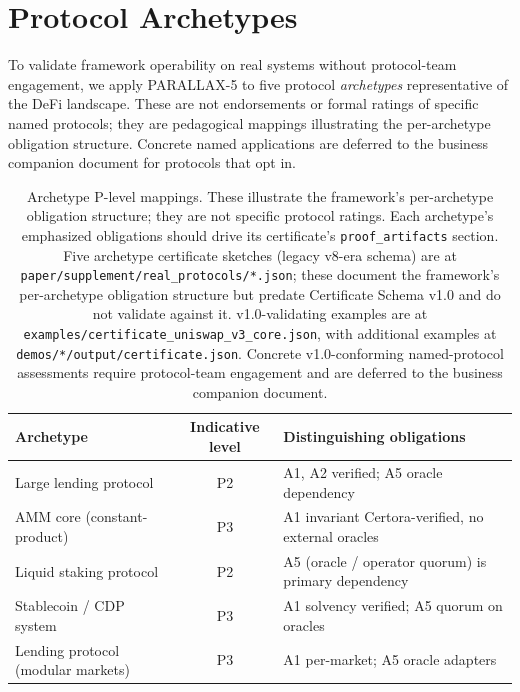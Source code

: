\documentclass[11pt,a4paper]{article}
\begin{document}
\clearpage

\section{Protocol Archetypes}\label{app:archetypes}

To validate framework operability on real systems without protocol-team engagement, we apply PARALLAX-5 to five protocol \emph{archetypes} representative of the DeFi landscape. These are not endorsements or formal ratings of specific named protocols; they are pedagogical mappings illustrating the per-archetype obligation structure. Concrete named applications are deferred to the business companion document for protocols that opt in.

\begin{table}[h]
\centering
\small
\begin{tabular}{p{4.5cm}cp{6.5cm}}
\toprule
Archetype & Indicative level & Distinguishing obligations \\
\midrule
Large lending protocol & P2 & A1, A2 verified; A5 oracle dependency \\
AMM core (constant-product) & P3 & A1 invariant Certora-verified, no external oracles \\
Liquid staking protocol & P2 & A5 (oracle / operator quorum) is primary dependency \\
Stablecoin / CDP system & P3 & A1 solvency verified; A5 quorum on oracles \\
Lending protocol (modular markets) & P3 & A1 per-market; A5 oracle adapters \\
\bottomrule
\end{tabular}
\caption{Archetype P-level mappings. These illustrate the framework's per-archetype obligation structure; they are not specific protocol ratings. Each archetype's emphasized obligations should drive its certificate's \texttt{proof\_artifacts} section. Five archetype certificate sketches (legacy v8-era schema) are at \texttt{paper/supplement/real\_protocols/*.json}; these document the framework's per-archetype obligation structure but predate Certificate Schema v1.0 and do not validate against it. v1.0-validating examples are at \texttt{examples/certificate\_uniswap\_v3\_core.json}, with additional examples at \texttt{demos/*/output/certificate.json}. Concrete v1.0-conforming named-protocol assessments require protocol-team engagement and are deferred to the business companion document.}\label{tab:archetypes}
\end{table}
\end{document}
